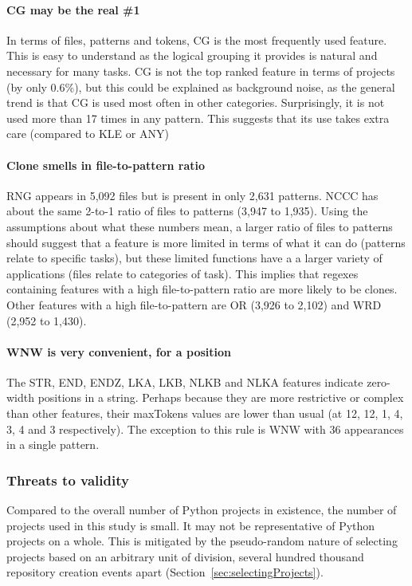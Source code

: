 \paragraph{CG may be the real \#1}  In terms of files, patterns and tokens, CG is the most frequently used feature.  This is easy to understand as the logical grouping it provides is natural and necessary for many tasks.  CG is not the top ranked feature in terms of projects (by only 0.6\%), but this could be explained as background noise, as the general trend is that CG is used most often in other categories.  Surprisingly, it is not used more than 17 times in any pattern.  This suggests that its use takes extra care (compared to KLE or ANY)

\paragraph{Clone smells in file-to-pattern ratio} RNG appears in 5,092 files but is present in only 2,631 patterns.  NCCC has about the same 2-to-1 ratio of files to patterns (3,947 to 1,935).  Using the assumptions about what these numbers mean, a larger ratio of files to patterns should suggest that a feature is more limited in terms of what it can do (patterns relate to specific tasks), but these limited functions have a a larger variety of applications (files relate to categories of task).  This implies that regexes containing features with a high file-to-pattern ratio are more likely to be clones.  Other features with a high file-to-pattern are OR (3,926 to 2,102) and WRD (2,952 to 1,430).

\paragraph{WNW is very convenient, for a position}  The STR, END, ENDZ, LKA, LKB, NLKB and NLKA features indicate zero-width positions in a string.  Perhaps because they are more restrictive or complex than other features, their maxTokens values are lower than usual (at 12, 12, 1, 4, 3, 4 and 3 respectively).  The exception to this rule is WNW with 36 appearances in a single pattern.

\subsubsection{Threats to validity}
Compared to the overall number of Python projects in existence, the number of projects used in this study is small.  It may not be representative of Python projects on a whole.  This is mitigated by the pseudo-random nature of selecting projects based on an arbitrary unit of division, several hundred thousand repository creation events apart (Section~\ref{sec:selectingProjects}).

